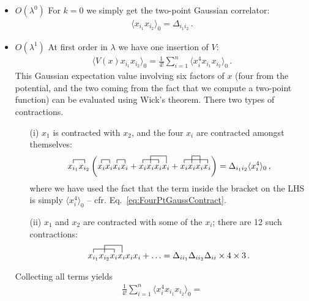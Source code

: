 \documentclass[notes.tex]{subfiles}
\begin{document}
\begin{itemize}
\item $O(\lambda^0)$ For $k=0$ we simply get the two-point Gaussian
  correlator: 
  \begin{align}
    \langle x_{i_1} x_{i_2} \rangle_0 = \Delta_{i_1 i_2}\, .
  \end{align}
\item $O(\lambda^1)$ At first order in $\lambda$ we have one insertion
  of $V$:
  \begin{align}
    \langle V(x) x_{i_1} x_{i_2} \rangle_0 = \frac{1}{4!} \sum_{i=1}^n
    \langle x_i^4 x_{i_1} x_{i_2} \rangle_0\, .
  \end{align}
  This Gaussian expectation value involving six factors of $x$ (four
  from the potential, and the two coming from the fact that we compute
  a two-point function) can be evaluated using Wick's
  theorem. There two types of contractions.
  \begin{itemize}
  \item [(i)] $x_1$ is contracted with $x_2$, and the four $x_i$ are
    contracted amongst themselves:
    \begin{align}
      \contraction{}{x_{i_1}}{}{x_{i_2}}
      x_{i_1} x_{i_2} 
      \left(
      \contraction{}{x_{i}}{}{x_{i}}
      \contraction{x_{i} x_{i}}{x_{i}}{}{x_{i}}
      x_{i} x_{i} x_{i} x_{i} +
      \contraction{}{x_{i}}{x_{i}}{x_{i}}
      \contraction[2ex]{x_{i}}{x_{i}}{ x_{i}}{x_{i}}
      x_{i} x_{i} x_{i} x_{i} +
      \contraction{}{x_{i}}{x_{i}x_{i}}{x_{i}}
      \contraction[2ex]{x_{i}}{x_{i}}{}{x_{i}}
      x_{i} x_{i} x_{i} x_{i} 
      \right) = \Delta_{i_1 i_2} \langle x_i^4\rangle_0
      \, ,
    \end{align}
    where we have used the fact that the term inside the bracket on
    the LHS is simply $\langle x_i^4\rangle_0$ --
    cfr. Eq.~\ref{eq:FourPtGaussContract}.
  \item [(ii)] $x_1$ and $x_2$ are contracted with some of the $x_i$;
    there are 12 such contractions:
    \begin{align}
      \contraction{}{x_{i_1}}{x_{i_2}}{x_{i}}
      \contraction[2ex]{x_{i_1}}{x_{i_2}}{x_{i}}{x_{i}}
      x_{i_1} x_{i_2}  x_{i} x_{i} x_{i} x_{i} + \ldots = 
      \Delta_{i i_1} \Delta_{i i_2} \Delta_{i i} \times 4
      \times 3\, .
    \end{align}
  \end{itemize}
  Collecting all terms yields
  \begin{align}
   \frac{1}{4!} \sum_{i=1}^n
    \langle x_i^4 x_{i_1} x_{i_2} \rangle_0 = 

\end{align}
\end{itemize}
\end{document}
